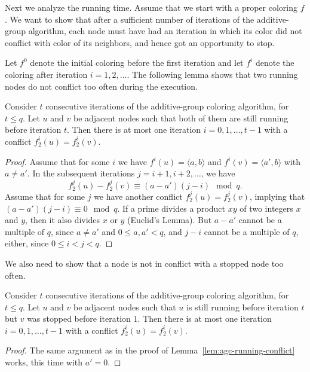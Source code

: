 Next we analyze the running time. Assume that we start with a proper coloring $f$. We want to show that after a sufficient number of iterations of the additive-group algorithm, each node must have had an iteration in which its color did not conflict with color of its neighbors, and hence got an opportunity to stop.

Let $f^0$ denote the initial coloring before the first iteration and let $f^i$ denote the coloring after iteration $i = 1, 2, \dotsc$. The following lemma shows that two running nodes do not conflict too often during the execution.

\begin{lemma} \label{lem:agc-running-conflict}
  Consider $t$ consecutive iterations of the additive-group coloring algorithm, for $t \leq q$. Let $u$ and $v$ be adjacent nodes such that both of them are still running before iteration $t$. Then there is at most one iteration $i = 0, 1, \dotsc, t-1$ with a conflict $f_2^i(u) = f_2^i(v)$.
\end{lemma}

\begin{proof}
  Assume that for some $i$ we have $f^i(u) = \langle a, b \rangle$ and $f^i(v) = \langle a', b \rangle$ with $a \ne a'$. In the subsequent iterations $j=i+1,i+2,\dots$, we have
  \[
    f^j_2(u) - f^j_2(v) \equiv (a-a')(j-i) \mod q.
  \]
  Assume that for some $j$ we have another conflict $f^j_2(u) = f^j_2(v)$, implying that $(a-a')(j-i) \equiv 0 \mod q$. If a prime divides a product $xy$ of two integers $x$ and $y$, then it also divides $x$ or $y$ (Euclid's Lemma). But $a-a'$ cannot be a multiple of $q$, since $a \ne a'$ and $0 \le a, a' < q$, and $j-i$ cannot be a multiple of $q$, either, since $0 \le i < j < q$.
\end{proof}

We also need to show that a node is not in conflict with a stopped node too often.

\begin{lemma} \label{lem:agc-finished-conflict}
  Consider $t$ consecutive iterations of the additive-group coloring algorithm, for $t \leq q$. Let $u$ and $v$ be adjacent nodes such that $u$ is still running before iteration $t$ but $v$ was stopped before iteration $1$. Then there is at most one iteration $i = 0, 1, \dotsc, t-1$ with a conflict $f_2^i(u) = f_2^i(v)$.
\end{lemma}

\begin{proof}
  The same argument as in the proof of Lemma~\ref{lem:agc-running-conflict} works, this time with $a' = 0$.
\end{proof}


